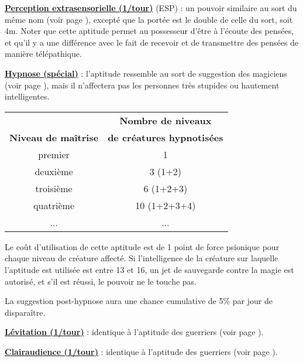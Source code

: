 \bigskip

\label{magicien-ESP}\textbf{\uline{Perception extrasensorielle (1/tour)}} (ESP) : un pouvoir similaire au sort du même nom (voir page \pageref{sort-esp}), excepté que la portée est le double de celle du sort, soit 4m. Noter que cette aptitude permet au possesseur d'être \og à l'écoute \fg{} des pensées, et qu'il y a une différence avec le fait de recevoir et de transmettre des pensées de manière télépathique.

\bigskip

\label{magicien-hypnose}\textbf{\uline{Hypnose (spécial)}} : l'aptitude ressemble au sort de suggestion des magiciens (voir page \pageref{sort-suggestion}), mais il n'affectera pas les personnes très stupides ou hautement intelligentes.

\bigskip

\begin{tabular}{cc}
                            &\textbf{Nombre de niveaux} \\
\textbf{Niveau de maîtrise} & \textbf{de créatures hypnotisées}\\
premier     & 1   \\
deuxième    & 3 (1+2)   \\
troisième   & 6 (1+2+3)  \\
quatrième   & 10 (1+2+3+4) \\
...         & ...    \\
\end{tabular}

\bigskip

Le coût d'utilisation de cette aptitude est de 1 point de force psionique pour chaque niveau de créature affecté. Si l'intelligence de la créature sur laquelle l'aptitude est utilisée est entre 13 et 16, un jet de sauvegarde contre la magie est autorisé, et s'il est réussi, le pouvoir ne le touche pas.

\bigskip

La suggestion post-hypnose aura une chance cumulative de 5\% par jour de disparaître.

\bigskip

\textbf{\uline{Lévitation (1/tour)}} : identique à l'aptitude des guerriers (voir page \pageref{guerrier-levitation}).

\bigskip

\textbf{\uline{Clairaudience (1/tour)}} : identique à l'aptitude des guerriers (voir page \pageref{guerrier-clairaudience}).

